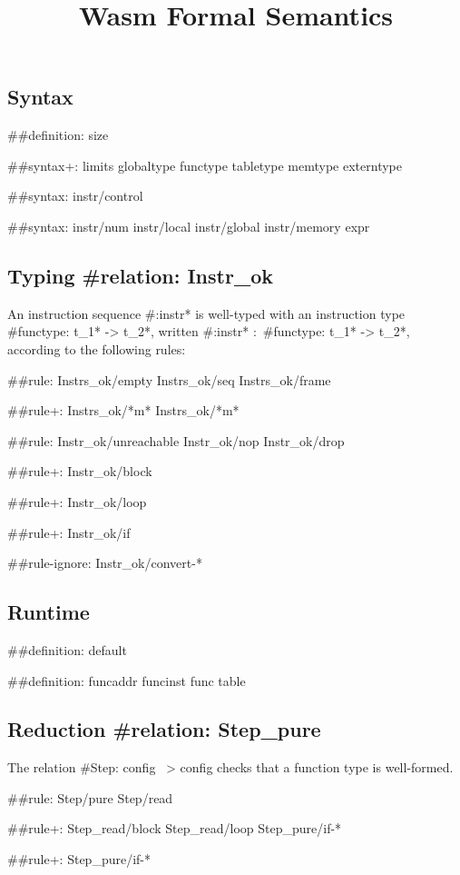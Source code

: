 \documentclass[a4paper]{scrartcl}
\title{Wasm Formal Semantics}
\begin{document}
\small

\maketitle


\subsection*{Syntax}

##{definition: size}

##{syntax+:
  limits
  {globaltype
  functype
  tabletype
  memtype}
  {}
  externtype
}

##{syntax: {instr/control}}

##{syntax: {instr/num instr/local instr/global instr/memory} expr}


\subsection*{Typing #{relation: Instr_ok}}

An instruction sequence #{:instr*} is well-typed with an instruction type #{functype: t_1* -> t_2*}, written #{:instr*} $:$ #{functype: t_1* -> t_2*}, according to the following rules:

##{rule:
  {Instrs_ok/empty Instrs_ok/seq}
  {Instrs_ok/frame}
}

##{rule+: Instrs_ok/*m* {Instrs_ok/*m*}}

##{rule: {Instr_ok/unreachable Instr_ok/nop Instr_ok/drop}}

##{rule+: Instr_ok/block}

##{rule+: Instr_ok/loop}

##{rule+: Instr_ok/if}


##{rule-ignore: Instr_ok/convert-*}


\subsection*{Runtime}

##{definition: default}

##{definition: {funcaddr funcinst} {func table}}


\subsection*{Reduction #{relation: Step_pure}}

The relation #{Step: config ~> config} checks that a function type is well-formed.

##{rule: Step/pure Step/read}

##{rule+: {Step_read/block Step_read/loop} {Step_pure/if-*}}

##{rule+: Step_pure/if-*}
\end{document}
